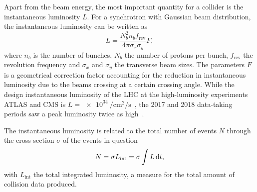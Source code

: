 Apart from the beam energy, the most important quantity for a collider is the instantaneous luminosity $L$. For a synchrotron with Gaussian beam distribution, the instantaneous luminosity can be written as
\begin{equation}
	L = \frac{N_b^2 n_b f_\mathrm{rev}}{4\pi\sigma_x\sigma_y} F,
	\label{eq:lumi}
\end{equation}
where $n_b$ is the number of bunches, $N_b$ the number of protons per bunch, $f_\mathrm{rev}$ the revolution frequency and $\sigma_x$ and $\sigma_y$ the transverse beam sizes. The parameters $F$ is a geometrical correction factor accounting for the reduction in instantaneous luminosity due to the beams crossing at a certain crossing angle. While the design instantaneous luminosity of the LHC at the high-luminosity experiments ATLAS and CMS is $L = \SI{e34}{\per\cm\squared\per\second}$~\cite{Evans:1129806}, the 2017 and 2018 data-taking periods saw a peak luminosity twice as high~\cite{peak_lumi}.

The instantaneous luminosity is related to the total number of events $N$ through the cross section $\sigma$ of the events in question
\begin{equation}
	N = \sigma L_\mathrm{int} = \sigma \int L\mathop{}\!\mathrm{d} t,
\end{equation}
with $L_\mathrm{int}$ the total integrated luminosity, a measure for the total amount of collision data produced.

